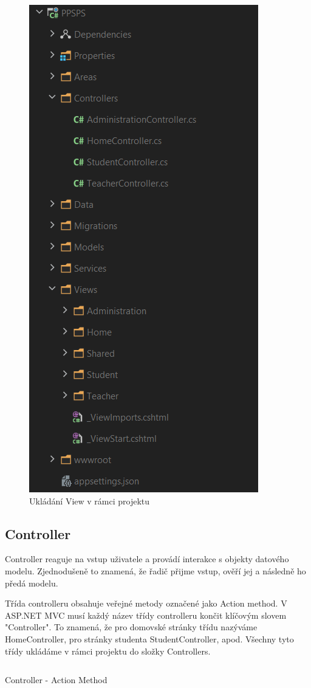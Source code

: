 \documentclass[a4paper, 12pt]{report}
\begin{document}
				\begin{figure}[H]
					\centering
					\includegraphics[scale=0.7]{ViewsController}
					\caption{Ukládání View v rámci projektu}
					\label{ViewsController}
				\end{figure}
			\subsection{Controller} \label{Controller_teorie}
			Controller reaguje na vstup uživatele a provádí interakce s objekty datového modelu. Zjednodušeně to znamená, že řadič přijme vstup, ověří jej a následně ho předá modelu.\cite{MVC_Wiki_EN}\par
			Třída controlleru obsahuje veřejné metody označené jako Action method. V ASP.NET MVC musí každý název třídy controlleru končit klíčovým slovem "Controller". To znamená, že pro domovské stránky třídu nazýváme HomeController, pro stránky studenta StudentController, apod. Všechny tyto třídy ukládáme v rámci projektu do složky Controllers.
	\begin{listing}[H]
	\inputminted{csharp}{SourceCode/Controllers/ActionMethod.cs}
	\caption{Controller - Action Method}
	\label{ActionMethod}
	\end{listing}
\end{document}
